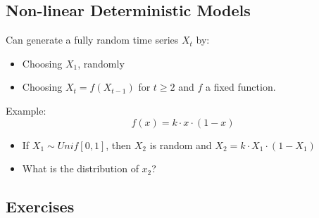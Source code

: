\subsection{Non-linear Deterministic Models}
Can generate a fully random time series $X_t$ by: 
\begin{itemize}
    \item Choosing $X_1$, randomly
    \item Choosing $X_t=f(X_{t-1})$ for $t\geq 2$ and $f$ a fixed function.
\end{itemize}

Example:
\[
f(x)=k\cdot x\cdot (1-x)
\]
\begin{itemize}
    \item If $X_1 \sim Unif[0,1]$, then $X_2$ is random and $X_2=k\cdot X_1 \cdot (1-X_1)$
    \item What is the distribution of $x_2$?
\end{itemize}


\subsection{Exercises}

